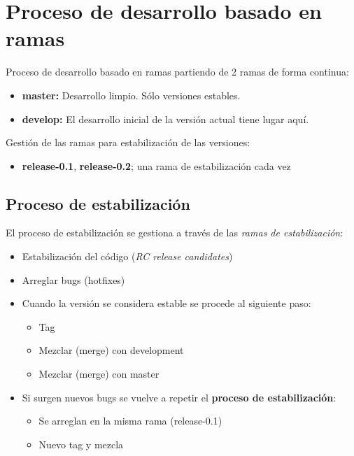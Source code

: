 

\section{Proceso de desarrollo basado en ramas}
\label{sec:desarrollo-en-ramas}

\par Proceso de desarrollo basado en ramas partiendo de 2 ramas de forma continua:

\begin{itemize}
    \item \textbf{master:} Desarrollo limpio. Sólo versiones estables.
    \item \textbf{develop:} El desarrollo inicial de la versión actual tiene lugar aquí.
\end{itemize}

\par Gestión de las ramas para estabilización de las versiones:

\begin{itemize}
    \item \textbf{release-0.1}, \textbf{release-0.2}; una rama de estabilización cada vez   
\end{itemize}

\subsection{Proceso de estabilización}

\par El proceso de estabilización se gestiona a través de las \emph{ramas de estabilización}:

\begin{itemize}
    \item Estabilización del código (\emph{RC release candidates})
    \item Arreglar bugs (hotfixes)
    \item Cuando la versión se considera estable se procede al siguiente paso:
        \begin{itemize}
            \item Tag
            \item Mezclar (merge) con development
            \item Mezclar (merge) con master
        \end{itemize}
    \item Si surgen nuevos bugs se vuelve a repetir el \textbf{proceso de estabilización}:
        \begin{itemize}
            \item Se arreglan en la misma rama (release-0.1)
            \item Nuevo tag y mezcla
        \end{itemize}
\end{itemize}

